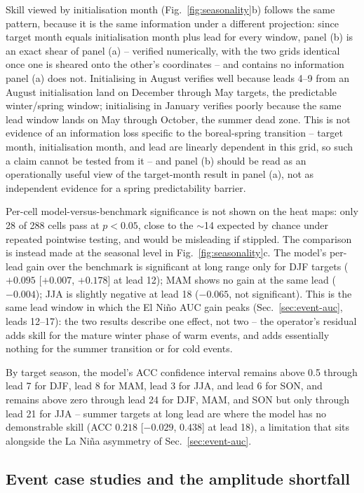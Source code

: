 Skill viewed by initialisation month (Fig.~\ref{fig:seasonality}b) follows the same pattern,
because it is the same information under a different projection: since target month equals
initialisation month plus lead for every window, panel (b) is an exact shear of panel (a) --
verified numerically, with the two grids identical once one is sheared onto the other's
coordinates -- and contains no information panel (a) does not. Initialising in August
verifies well because leads 4--9 from an August initialisation land on December through May
targets, the predictable winter/spring window; initialising in January verifies poorly because
the same lead window lands on May through October, the summer dead zone. This is not evidence
of an information loss specific to the boreal-spring transition -- target month, initialisation
month, and lead are linearly dependent in this grid, so such a claim cannot be tested from it --
and panel (b) should be read as an operationally useful view of the target-month result in
panel (a), not as independent evidence for a spring predictability barrier.

Per-cell model-versus-benchmark significance is not shown on the heat maps: only 28 of 288
cells pass at $p<0.05$, close to the $\sim$14 expected by chance under repeated pointwise
testing, and would be misleading if stippled. The comparison is instead made at the seasonal
level in Fig.~\ref{fig:seasonality}c. The model's per-lead gain over the benchmark is
significant at long range only for DJF targets ($+0.095$ [$+0.007$, $+0.178$] at lead 12); MAM
shows no gain at the same lead ($-0.004$); JJA is slightly negative at lead 18 ($-0.065$, not
significant). This is the same lead window in which the El Ni\~no AUC gain peaks
(Sec.~\ref{sec:event-auc}, leads 12--17): the two results describe one effect, not two -- the
operator's residual adds skill for the mature winter phase of warm events, and adds
essentially nothing for the summer transition or for cold events.

By target season, the model's ACC confidence interval remains above 0.5 through lead 7 for
DJF, lead 8 for MAM, lead 3 for JJA, and lead 6 for SON, and remains above zero through lead 24
for DJF, MAM, and SON but only through lead 21 for JJA -- summer targets at long lead are where
the model has no demonstrable skill (ACC $0.218$ [$-0.029$, $0.438$] at lead 18), a limitation
that sits alongside the La Ni\~na asymmetry of Sec.~\ref{sec:event-auc}.

\subsection{Event case studies and the amplitude shortfall}
\label{sec:case-studies}


